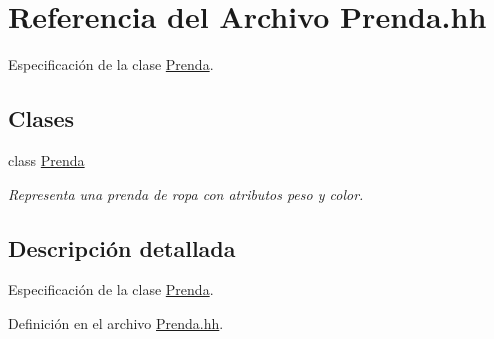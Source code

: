 \hypertarget{_prenda_8hh}{\section{Referencia del Archivo Prenda.\+hh}
\label{_prenda_8hh}
}


Especificación de la clase \hyperlink{class_prenda}{Prenda}.  


\subsection*{Clases}
\begin{DoxyCompactItemize}
\item 
class \hyperlink{class_prenda}{Prenda}
\begin{DoxyCompactList}\small\item\em Representa una prenda de ropa con atributos peso y color. \end{DoxyCompactList}\end{DoxyCompactItemize}


\subsection{Descripción detallada}
Especificación de la clase \hyperlink{class_prenda}{Prenda}. 



Definición en el archivo \hyperlink{_prenda_8hh_source}{Prenda.\+hh}.


